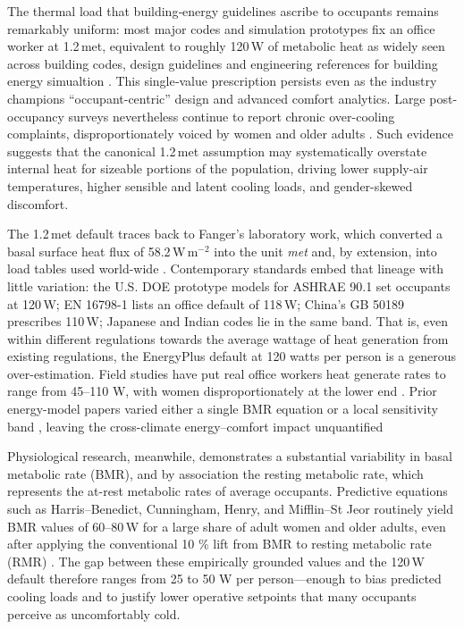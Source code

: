The thermal load that building‐energy guidelines ascribe to occupants remains remarkably uniform: most major codes and simulation prototypes fix an office worker at 1.2\,met, equivalent to roughly 120\,W of metabolic heat as widely seen across building codes, design guidelines\citep{EN16798_2019, GB50189_2015, JISA4706_2007} and engineering references for building energy simualtion \citep{DOEPrototype2018, ECBC2017}.  This single‐value prescription persists even as the industry champions “occupant-centric” design and advanced comfort analytics.  Large post-occupancy surveys nevertheless continue to report chronic over-cooling complaints, disproportionately voiced by women and older adults \citep{Karjalainen2007, Schweiker2012, Kim2021}.  Such evidence suggests that the canonical 1.2\,met assumption may systematically overstate internal heat for sizeable portions of the population, driving lower supply-air temperatures, higher sensible and latent cooling loads, and gender-skewed discomfort.

The 1.2\,met default traces back to Fanger’s laboratory work, which converted a basal surface heat flux of 58.2\,W\,m$^{-2}$ into the unit \textit{met} and, by extension, into load tables used world-wide \citep{Fanger1970}.  Contemporary standards embed that lineage with little variation: the U.S. DOE prototype models for ASHRAE 90.1 set occupants at 120\,W; EN 16798-1 lists an office default of 118\,W; China’s GB 50189 prescribes 110\,W; Japanese and Indian codes lie in the same band. That is, even within different regulations towards the average wattage of heat generation from existing regulations, the EnergyPlus default at 120 watts per person is a generous over-estimation. Field studies have put real office workers heat generate rates to range from 45–110 W, with women disproportionately at the lower end \citep{Karjalainen2007, Kingma2015}. Prior energy-model papers varied either a single BMR equation \citep{Ahmed2017} or a local sensitivity band \citep{Chen2020}, leaving the cross-climate energy–comfort impact unquantified

Physiological research, meanwhile, demonstrates a substantial variability in basal metabolic rate (BMR), and by association the resting metabolic rate, which represents the at-rest metabolic rates of average occupants.  Predictive equations such as Harris–Benedict, Cunningham, Henry, and Mifflin–St Jeor routinely yield BMR values of 60–80\,W for a large share of adult women and older adults, even after applying the conventional 10 \% lift from BMR to resting metabolic rate (RMR) \citep{HarrisBenedict1918, Cunningham1980, Henry2005, Mifflin1990}.  The gap between these empirically grounded values and the 120\,W default therefore ranges from 25 to 50 W per person—enough to bias predicted cooling loads and to justify lower operative setpoints that many occupants perceive as uncomfortably cold.

